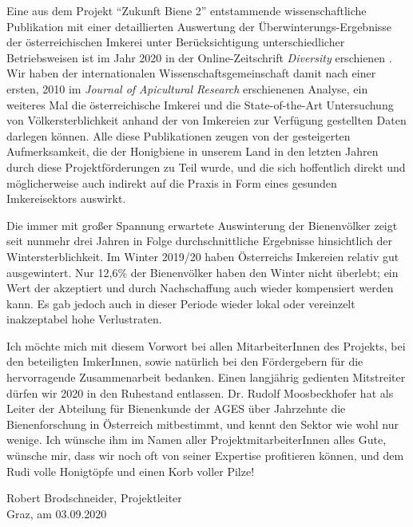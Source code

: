 Eine aus dem Projekt \enquote{Zukunft Biene 2} entstammende wissenschaftliche Publikation mit einer detaillierten Auswertung der Überwinterungs-Ergebnisse der österreichischen Imkerei unter Berücksichtigung unterschiedlicher Betriebsweisen ist im Jahr 2020 in der Online-Zeitschrift \textit{Diversity} erschienen \citep{oberreiter2020}. Wir haben der internationalen Wissenschaftsgemeinschaft damit nach einer ersten, 2010 im \textit{Journal of Apicultural Research} erschienenen Analyse, ein weiteres Mal die österreichische Imkerei und die State-of-the-Art Untersuchung von Völkersterblichkeit anhand der von Imkereien zur Verfügung gestellten Daten darlegen können. Alle diese Publikationen zeugen von der gesteigerten Aufmerksamkeit, die der Honigbiene in unserem Land in den letzten Jahren durch diese Projektförderungen zu Teil wurde, und die sich hoffentlich direkt und möglicherweise auch indirekt auf die Praxis in Form eines gesunden Imkereisektors auswirkt.

Die immer mit großer Spannung erwartete Auswinterung der Bienenvölker zeigt seit nunmehr drei Jahren in Folge durchschnittliche Ergebnisse hinsichtlich der Wintersterblichkeit. Im Winter 2019/20 haben Österreichs Imkereien relativ gut ausgewintert. Nur 12,6\% der Bienenvölker haben den Winter nicht überlebt; ein Wert der akzeptiert und durch Nachschaffung auch wieder kompensiert werden kann. Es gab jedoch auch in dieser Periode wieder lokal oder
vereinzelt inakzeptabel hohe Verlustraten.

Ich möchte mich mit diesem Vorwort bei allen MitarbeiterInnen des Projekts, bei den beteiligten ImkerInnen, sowie natürlich bei den Fördergebern für die hervorragende Zusammenarbeit bedanken.
Einen langjährig gedienten Mitstreiter dürfen wir 2020 in den Ruhestand entlassen. Dr. Rudolf Moosbeckhofer hat als Leiter der Abteilung für Bienenkunde der AGES über Jahrzehnte die Bienenforschung in Österreich mitbestimmt, und kennt den Sektor wie wohl nur wenige. Ich wünsche ihm im Namen aller ProjektmitarbeiterInnen alles Gute, wünsche mir, dass wir noch oft von seiner Expertise profitieren können, und dem Rudi volle Honigtöpfe und einen Korb voller Pilze!

\begin{flushright}
    Robert Brodschneider, Projektleiter \\
    Graz, am 03.09.2020
\end{flushright}